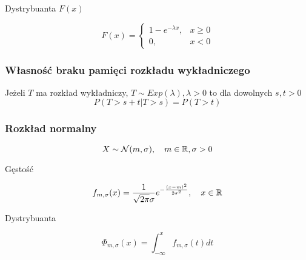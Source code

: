 \documentclass[../Matematyka.tex]{subfiles}
\begin{document}
\begin{multicols}{2}
    \begin{center}
        Dystrybuanta \(F(x)\)
    \end{center}

    \[
        F(x) =
        \begin{cases}
            1 - e^{-\lambda x}, & x \geq 0 \\
            0,                  & x < 0
        \end{cases}
    \]
\end{multicols}
\subsubsection*{Własność braku pamięci rozkładu wykładniczego}
    Jeżeli \(T\) ma rozkład wykładniczy, \(T \sim Exp(\lambda), \lambda > 0\) to dla dowolnych \(s, t > 0\)
    \[P(T > s+t | T > s) = P(T > t)\]

\subsubsection{Rozkład normalny}
\[X \sim \mathcal{N} (m, \sigma), \quad m \in \mathbb{R}, \sigma > 0\]
\begin{multicols}{2}
    \begin{center}
        Gęstość
    \end{center}
    \[f_{m,\sigma}(x) = \frac{1}{\sqrt{2\pi} \sigma}e^{-\frac{(x-m)^2}{2\sigma^2}}, \quad x \in \mathbb{R}\]

    \begin{center}
        Dystrybuanta
    \end{center}
    \[\Phi_{m,\sigma}(x) = \int_{-\infty}^{x}f_{m,\sigma}(t)dt\]
\end{multicols}
\end{document}
